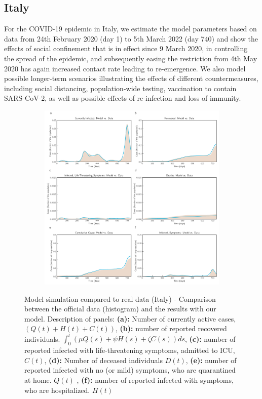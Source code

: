 \documentclass[10pt]{wlscirep}
\begin{document}
\subsection*{Italy}
For the COVID-19 epidemic in Italy, we estimate the model parameters based on data from 24th February 2020 (day 1) to 5th March 2022 (day 740) and show the effects of social confinement that is in effect since 9 March 2020, in controlling the spread of the epidemic, and subsequently easing the restriction from 4th May 2020 has again increased contact rate leading to re-emergence. We also model possible longer-term scenarios illustrating the effects of different countermeasures, including social distancing, population-wide testing, vaccination to contain SARS-CoV-2, as well as possible effects of re-infection and loss of immunity.
%
%
\begin{figure}[t!]
	\centering
	\begin{subfigure}[b]{\textwidth}
		\centering
		\includegraphics[width=\linewidth]{Italy_plot_model_data.pdf}
	\end{subfigure}
	\caption{Model simulation compared to real data (Italy) - Comparison between the official data (histogram) and the results with our model. Description of panels: \textbf{(a):} Number of currently active cases, $\left( Q(t) + H(t) + C(t)\right)$, \textbf{(b):} number of reported recovered individuals. $\int_{0}^{t}{\left( \mu Q(s) + \psi H(s) + \zeta  C(s) \right) ds}$, \textbf{(c):} number of reported infected with life-threatening symptoms, admitted to ICU, $C(t)$, \textbf{(d):} Number of deceased individuals $D(t)$, \textbf{(e):} number of reported infected with no (or mild) symptoms, who are quarantined at home. $Q(t)$ , \textbf{(f):} number of reported infected with symptoms, who are hospitalized. $H(t)$}
	\label{fig2A} 
\end{figure}
%
\end{document}
